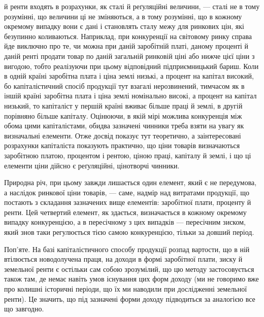 й ренти входять в розрахунки, як сталі й реґуляційні величини, — сталі не в тому
розумінні, що величини ці не зміняються, а в тому розумінні, що в кожному окремому
випадку вони є дані і становлять сталу межу для ринкових цін, які безупинно
коливаються. Наприклад, при конкуренції на світовому ринку справа
йде виключно про те, чи можна при даній заробітній платі, даному проценті й
даній ренті продати товар по даній загальній ринковій ціні або нижче цієї ціни
з вигодою, тобто реалізуючи при цьому відповідний підприємницький бариш.
Коли в одній країні заробітна плата і ціна землі низькі, а процент на капітал
високий, бо капіталістичний спосіб продукції тут взагалі нерозвинений,
тимчасом як в іншій країні заробітна плата і ціна землі номінально високі, а
процент на капітал низький, то капіталіст у першій країні вживає більше праці
й землі, в другій порівняно більше капіталу. Оцінюючи, в якій мірі можлива
конкуренція між обома цими капіталістами, обидва зазначені чинники треба
взяти на увагу як визначальні елементи. Отже досвід показує тут теоретично, а
заінтересовані розрахунки капіталіста показують практично, що ціни товарів
визначаються заробітною платою, процентом і рентою, ціною праці, капіталу
й землі, і що ці елементи ціни дійсно є реґуляційні, цінотворчі чинники.

Природна річ, при цьому завжди лишається один елемент, який є не
передумова, а наслідок ринкової ціни товарів, — саме, надмір над витратами продукції, що постають з
складання зазначених вище елементів: заробітної плати,
проценту й ренти. Цей четвертий елемент, як здається, визначається в кожному
окремому випадку конкуренцією, а в пересічному з цих випадків — пересічним
зиском, який знов таки регулюється тією самою конкуренцією, тільки за довший
період.

Поп’яте. На базі капіталістичного способу продукції розпад вартости, що
в ній втілюється новодолучена праця, на доходи в формі заробітної плати, зиску
й земельної ренти є остільки сам собою зрозумілий, що цю методу застосовується
також там, де немає навіть умов існування цих форм доходу (ми не говоримо
вже про колишні історичні періоди, що їх ми наводили при дослідженні
земельної ренти). Це значить, що під зазначені форми доходу підводиться за
аналогією все що завгодно.

